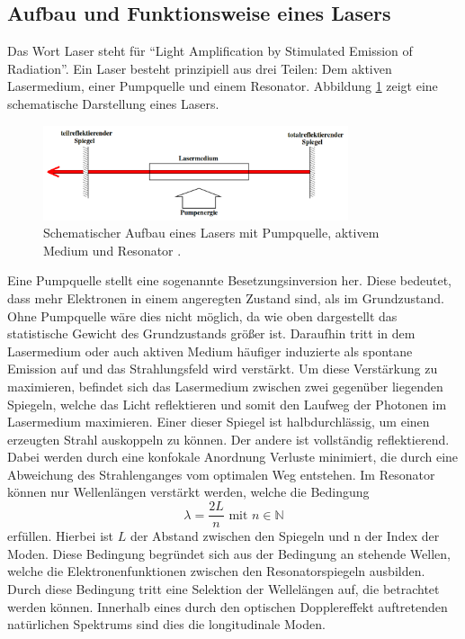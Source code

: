 \subsection{Aufbau und Funktionsweise eines Lasers}
Das Wort Laser steht für \enquote{Light Amplification by Stimulated Emission of
Radiation}. Ein Laser besteht prinzipiell aus drei Teilen:
Dem aktiven Lasermedium, einer Pumpquelle und einem Resonator.
Abbildung \ref{pic:laser} zeigt eine schematische Darstellung eines Lasers.
\begin{figure}[htb]
  \centering
  \includegraphics[width=0.8\textwidth]{content/prinzip_laser.png}
  \caption{Schematischer Aufbau eines Lasers mit Pumpquelle, aktivem Medium und Resonator \cite{anleitung}.}
  \label{pic:laser}
\end{figure}
Eine Pumpquelle stellt eine sogenannte Besetzungsinversion her.
Diese bedeutet, dass mehr Elektronen in einem angeregten Zustand sind, als
im Grundzustand. Ohne Pumpquelle wäre dies nicht möglich, da wie oben
dargestellt das statistische Gewicht des Grundzustands größer ist.
Daraufhin tritt in dem Lasermedium oder auch aktiven Medium häufiger
induzierte als spontane Emission auf und das
Strahlungsfeld wird verstärkt.
Um diese Verstärkung zu maximieren, befindet sich das Lasermedium zwischen
zwei gegenüber liegenden Spiegeln, welche das Licht reflektieren und somit
den Laufweg der Photonen im Lasermedium maximieren.
Einer dieser Spiegel ist halbdurchlässig,
um einen erzeugten Strahl auskoppeln zu können. Der andere ist vollständig reflektierend.
Dabei werden durch eine konfokale Anordnung Verluste minimiert,
die durch eine Abweichung des Strahlenganges vom optimalen Weg entstehen.
Im Resonator können nur Wellenlängen verstärkt werden, welche die Bedingung
\begin{equation}
  \lambda = \frac{2L}{n} \text{ mit } n\in\mathds{N}
\end{equation}
erfüllen.
Hierbei ist $L$ der Abstand zwischen den Spiegeln und n der Index der Moden.
Diese Bedingung begründet sich aus der Bedingung an stehende Wellen,
welche die Elektronenfunktionen zwischen den Resonatorspiegeln ausbilden.
Durch diese Bedingung tritt eine Selektion der Wellelängen auf, die betrachtet werden können.
Innerhalb eines durch den optischen Dopplereffekt auftretenden natürlichen Spektrums
sind dies die longitudinale Moden.

